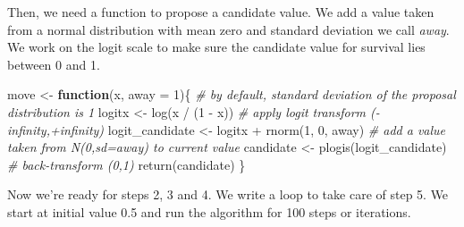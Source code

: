 \documentclass[
  12pt,
]{krantz}
\newenvironment{Shaded}{\begin{snugshade}}{\end{snugshade}}
\newcommand{\AttributeTok}[1]{\textcolor[rgb]{0.77,0.63,0.00}{#1}}
\newcommand{\CommentTok}[1]{\textcolor[rgb]{0.56,0.35,0.01}{\textit{#1}}}
\newcommand{\ControlFlowTok}[1]{\textcolor[rgb]{0.13,0.29,0.53}{\textbf{#1}}}
\newcommand{\DecValTok}[1]{\textcolor[rgb]{0.00,0.00,0.81}{#1}}
\newcommand{\FunctionTok}[1]{\textcolor[rgb]{0.00,0.00,0.00}{#1}}
\newcommand{\NormalTok}[1]{#1}
\newcommand{\OtherTok}[1]{\textcolor[rgb]{0.56,0.35,0.01}{#1}}
\newcommand{\SpecialCharTok}[1]{\textcolor[rgb]{0.00,0.00,0.00}{#1}}
\begin{document}
Then, we need a function to propose a candidate value. We add a value taken from a normal distribution with mean zero and standard deviation we call \emph{away}. We work on the logit scale to make sure the candidate value for survival lies between 0 and 1.

\begin{Shaded}
\begin{Highlighting}[]
\NormalTok{move }\OtherTok{\textless{}{-}} \ControlFlowTok{function}\NormalTok{(x, }\AttributeTok{away =} \DecValTok{1}\NormalTok{)\{ }\CommentTok{\# by default, standard deviation of the proposal distribution is 1}
\NormalTok{  logitx }\OtherTok{\textless{}{-}} \FunctionTok{log}\NormalTok{(x }\SpecialCharTok{/}\NormalTok{ (}\DecValTok{1} \SpecialCharTok{{-}}\NormalTok{ x)) }\CommentTok{\# apply logit transform ({-}infinity,+infinity)}
\NormalTok{  logit\_candidate }\OtherTok{\textless{}{-}}\NormalTok{ logitx }\SpecialCharTok{+} \FunctionTok{rnorm}\NormalTok{(}\DecValTok{1}\NormalTok{, }\DecValTok{0}\NormalTok{, away) }\CommentTok{\# add a value taken from N(0,sd=away) to current value}
\NormalTok{  candidate }\OtherTok{\textless{}{-}} \FunctionTok{plogis}\NormalTok{(logit\_candidate) }\CommentTok{\# back{-}transform (0,1)}
  \FunctionTok{return}\NormalTok{(candidate)}
\NormalTok{\}}
\end{Highlighting}
\end{Shaded}

Now we're ready for steps 2, 3 and 4. We write a loop to take care of step 5. We start at initial value 0.5 and run the algorithm for 100 steps or iterations.
\end{document}

